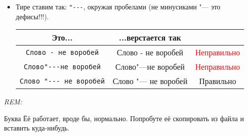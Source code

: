 \documentclass[12pt,a4paper]{book}
\newenvironment{Rem}{%
\par\textit{REM: }%
}{%
\par%
}
\newcommand{\ok}{& \textcolor{green!60!black}{Правильно}}
\newcommand{\bad}{& \textcolor{red}{Неправильно}}
\begin{document}
\begin{enumerate}
\begin{itemize}
\begin{center}
\begin{tabular}{|c|c|c|}
\hline \verb'$<G, \cdot>$' & $<G, \cdot>$ \bad \\
\hline \verb'\langle G, \cdot \rangle' & $\langle G, \cdot \rangle$ \ok \\
\hline \verb'\left<G, \cdot \right>' & $\left<G, \cdot \right>$ \ok \\
\hline \verb'$<a, \cfrac23>$' & $<a, \cfrac23>$ \bad \\
\hline \verb'\langle a, \cfrac23\rangle' & $\langle a, \cfrac23\rangle$ \bad \\
\hline \verb'\left<a, \cfrac23\right>' & $\left<a, \cfrac23\right>$ \ok \\
\hline
\end{tabular}\end{center}
\item Тире ставим так: \verb'"---', окружая пробелами (не минусиками "--- это дефисы!!!).
\begin{center}\begin{tabular}{|c|c|c|}
\hline Это... & ...верстается так & \\
\hline \verb'Слово - не воробей' & Слово - не воробей \bad \\
\hline \verb'Слово"---не воробей' & Слово"---не воробей \bad \\
\hline \verb'Слово "--- не воробей' & Слово "--- не воробей \ok \\
\hline
\end{tabular}\end{center}
\end{itemize}
\end{enumerate}
\begin{Rem}
Буква Ёё работает, вроде бы, нормально. Попробуте её скопировать из файла и вставить куда-нибудь.
\end{Rem}
\end{document}
